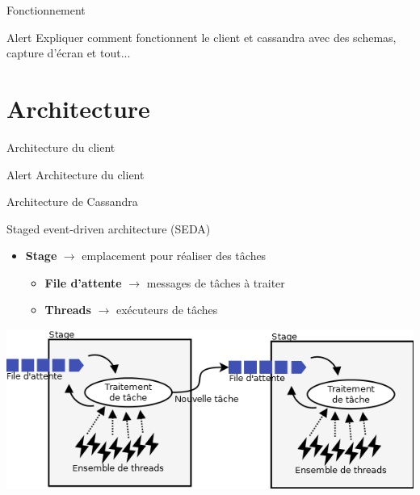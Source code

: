 \documentclass{beamer}
\begin{document}
\begin{frame}{Fonctionnement}
\begin{alertblock}{Alert}
    Expliquer comment fonctionnent le client et cassandra avec des schemas, capture d'écran et tout...
\end{alertblock}
\end{frame}


\section{Architecture}

\begin{frame}{Architecture du client}
\begin{alertblock}{Alert}
    Architecture du client
\end{alertblock}
\end{frame}

\begin{frame}{Architecture de Cassandra}
\begin{block}{Staged event-driven architecture (SEDA)}
\begin{itemize}
    \item \textbf{Stage} $\rightarrow$ emplacement pour réaliser des tâches
    \begin{itemize}
	    \item \textbf{File d'attente} $\rightarrow$ messages de tâches à traiter
	    \item \textbf{Threads} $\rightarrow$ exécuteurs de tâches
    \end{itemize}
\end{itemize}
\end{block}
\centering
	\includegraphics[scale=0.42]{stages}
\end{frame}
\end{document}
